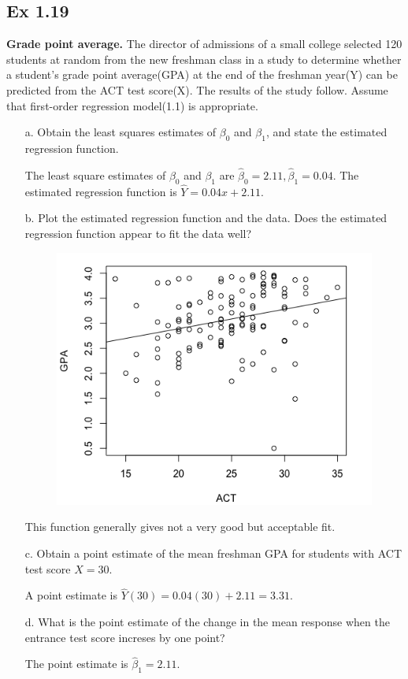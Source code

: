 \documentclass[10pt]{report}
\begin{document}
\subsection*{Ex 1.19}
\textbf{Grade point average.} The director of admissions of a small college selected 120 students at random from the new freshman class in a study to determine whether a student's grade point average(GPA) at the end of the freshman year(Y) can be predicted from the ACT test score(X). The results of the study follow. Assume that first-order regression model(1.1) is appropriate.
\begin{enumerate}
	\item [a.]
	Obtain the least squares estimates of $\beta_0$ and $\beta_1$, and state the estimated regression function.
	
	The least square estimates of $\beta_0$ and $\beta_1$ are $\hat{\beta}_0 = 2.11, \hat{\beta}_1 = 0.04$. The estimated regression function is $\hat{Y} = 0.04x + 2.11$.
	
	\item [b.]
	Plot the estimated regression function and the data. Does the estimated regression function appear to fit the data well?
	\begin{figure}[H]
		\centering
		\includegraphics[width=.6\linewidth]{19b.png}
	\end{figure}
	This function generally gives not a very good but acceptable fit.
	
	\item [c.]
	Obtain a point estimate of the mean freshman GPA for students with ACT test score $X=30$.
	
	A point estimate is $\hat{Y}(30) = 0.04(30) + 2.11 = 3.31$.
	
	\item [d.]
	What is the point estimate of the change in the mean response when the entrance test score increses by one point?
	
	The point estimate is $\hat{\beta}_1 = 2.11$.
\end{enumerate}
\end{document}
